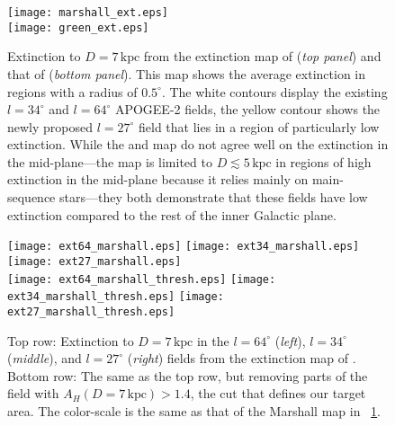 \documentclass[12pt,preprint]{aastex}
\begin{document}
\begin{figure}[t!]
\begin{center}
\texttt{[image: marshall\_ext.eps]}\\
\texttt{[image: green\_ext.eps]}
\end{center}
\caption{Extinction to $D=7\,\mathrm{kpc}$ from the extinction map of
  \citet{Marshall06a} (\emph{top panel}) and that of \citet{Green15a}
  (\emph{bottom panel}). This map shows the average extinction in
  regions with a radius of $0.5^\circ$. The white contours display the
  existing $l=34^\circ$ and $l=64^\circ$ APOGEE-2 fields, the yellow
  contour shows the newly proposed $l=27^\circ$ field that lies in a
  region of particularly low extinction. While the \citet{Marshall06a}
  and \citet{Green15a} map do not agree well on the extinction in the
  mid-plane---the \citet{Green15a} map is limited to $D
  \lesssim5\,\mathrm{kpc}$ in regions of high extinction in the
  mid-plane because it relies mainly on main-sequence stars---they
  both demonstrate that these fields have low extinction compared to
  the rest of the inner Galactic plane.}\label{fig:ext}
\end{figure}

\begin{figure}[t!]
\begin{center}
\texttt{[image: ext64\_marshall.eps]}
\texttt{[image: ext34\_marshall.eps]}
\texttt{[image: ext27\_marshall.eps]}\\
\texttt{[image: ext64\_marshall\_thresh.eps]}
\texttt{[image: ext34\_marshall\_thresh.eps]}
\texttt{[image: ext27\_marshall\_thresh.eps]}
\end{center}
\caption{Top row: Extinction to $D=7\,\mathrm{kpc}$ in the
  $l=64^\circ$ (\emph{left}), $l=34^\circ$ (\emph{middle}), and
  $l=27^\circ$ (\emph{right}) fields from the extinction map of
  \citet{Marshall06a}. Bottom row: The same as the top row, but
  removing parts of the field with $A_H(D=7\,\mathrm{kpc}) > 1.4$, the
  cut that defines our target area. The color-scale is the same as that
  of the Marshall map in
  \figurename~\ref{fig:ext}.}\label{fig:extfield}
\end{figure}
\end{document}
